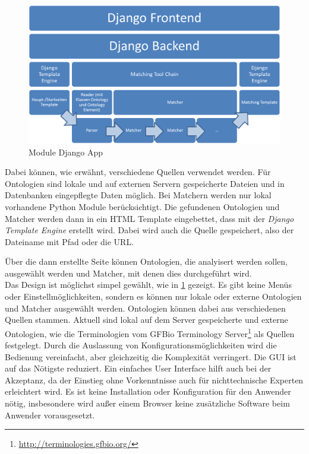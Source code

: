		\begin{figure}[h!]
		\centering
		\includegraphics[width=1.0\textwidth]{pics/Module-overview1.png}
		\caption{Module Django App}
		\label{fig3}
		\end{figure}
		
		Dabei können, wie erwähnt, verschiedene Quellen verwendet werden. Für
		Ontologien sind lokale und auf externen Servern gespeicherte Dateien und in
		Datenbanken eingepflegte Daten möglich. Bei Matchern werden nur lokal
		vorhandene Python Module berücksichtigt. Die gefundenen Ontologien und Matcher werden dann in
		ein HTML Template eingebettet, dass mit der \textit{Django Template Engine}
		erstellt wird. Dabei wird auch die Quelle gespeichert, also der Dateiname mit Pfad oder die URL.
		
		\pagebreak[4]
		
		Über die dann erstellte Seite können Ontologien, die
		analyisert werden sollen, ausgewählt werden und Matcher, mit denen dies durchgeführt wird.\\
		Das Design ist möglichst simpel gewählt, wie in \ref{fig3} gezeigt. Es gibt
		keine Menüs oder Einstellmöglichkeiten, sondern es können nur
		lokale oder externe Ontologien und Matcher ausgewählt
		werden. Ontologien können dabei aus verschiedenen Quellen stammen. Aktuell
		sind lokal auf dem Server gespeicherte und externe Ontologien, wie
		die Terminologien vom GFBio Terminology
		Server\footnote{\url{http://terminologies.gfbio.org/}} als Quellen festgelegt.
		Durch die Auslassung von Konfigurationsmöglichkeiten wird die Bedienung
		vereinfacht, aber gleichzeitig die Komplexität verringert. Die GUI ist auf
		das Nötigste reduziert. Ein einfaches User Interface hilft auch bei der Akzeptanz, da der
		Einstieg ohne Vorkenntnisse auch für nichttechnische Experten erleichtert
		wird. Es ist keine Installation oder Konfiguration für den Anwender nötig,
		insbesondere wird außer einem Browser keine zusätzliche Software beim Anwender
		vorausgesetzt.
		
